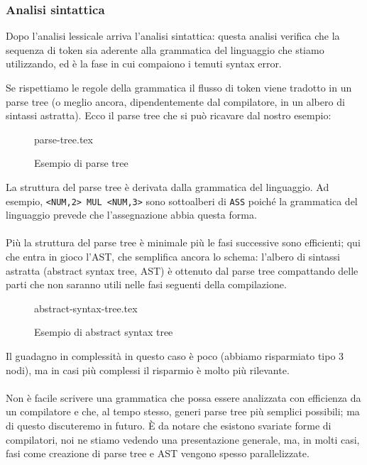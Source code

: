 \documentclass[class=book, crop=false, oneside, 12pt]{standalone}
\begin{document}
\subsubsection{Analisi sintattica}
Dopo l'analisi lessicale arriva l'analisi sintattica: questa analisi verifica che la sequenza di token sia aderente alla grammatica del linguaggio che stiamo utilizzando, ed è la fase in cui compaiono i temuti syntax error.

Se rispettiamo le regole della grammatica il flusso di token viene tradotto in un parse tree (o meglio ancora, dipendentemente dal compilatore, in un albero di sintassi astratta). Ecco il parse tree che si può ricavare dal nostro esempio:
\begin{figure}[H]
	\centering
	{parse-tree.tex}
	\caption{Esempio di parse tree}
\end{figure}
La struttura del parse tree è derivata dalla grammatica del linguaggio. Ad esempio, \texttt{<NUM,2> MUL <NUM,3>} sono sottoalberi di \texttt{ASS} poiché la grammatica del linguaggio prevede che l'assegnazione abbia questa forma. 

\paragraph{}
Più la struttura del parse tree è minimale più le fasi successive sono efficienti; qui che entra in gioco l'AST, che semplifica ancora lo schema: l'albero di sintassi astratta (abstract syntax tree, AST) è ottenuto dal parse tree compattando delle parti che non saranno utili nelle fasi seguenti della compilazione.
\begin{figure}[H]
	\centering
	{abstract-syntax-tree.tex}
	\caption{Esempio di abstract syntax tree}
	\label{esempioAST}
\end{figure}
Il guadagno in complessità in questo caso è poco (abbiamo risparmiato tipo 3 nodi), ma in casi più complessi il risparmio è molto più rilevante.
\paragraph*{}
Non è facile scrivere una grammatica che possa essere analizzata con efficienza da un compilatore e che, al tempo stesso, generi parse tree più semplici possibili; ma di questo discuteremo in futuro. È da notare che esistono svariate forme di compilatori, noi ne stiamo vedendo una presentazione generale, ma, in molti casi, fasi come creazione di parse tree e AST vengono spesso parallelizzate.
\end{document}
